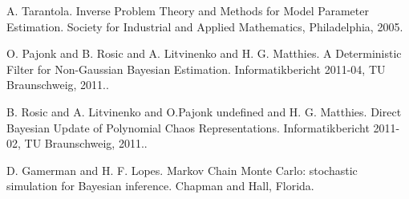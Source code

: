 
\begin{thebibliography}{10}

{\sc A. Tarantola}. { Inverse Problem Theory and Methods for Model Parameter Estimation}. Society for Industrial and Applied Mathematics, Philadelphia, 2005.



{\sc O. Pajonk and B. Rosic and A. Litvinenko and H. G. Matthies}. {A Deterministic Filter for Non-Gaussian Bayesian Estimation}. Informatikbericht 2011-04, TU Braunschweig, 2011..



{\sc B. Rosic and A. Litvinenko and O.Pajonk undefined and H. G. Matthies}. {Direct Bayesian Update of Polynomial Chaos Representations}. Informatikbericht 2011-02, TU Braunschweig, 2011..



{\sc D. Gamerman and H. F. Lopes}. {Markov Chain Monte Carlo: stochastic simulation for Bayesian inference}. Chapman and Hall, Florida.

\end{thebibliography}
